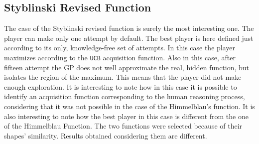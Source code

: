 \subsection{Styblinski Revised Function}
The case of the Styblinski revised function is surely the most interesting one. The player can make only one attempt by default. The best player is here defined just according to its only, knowledge-free set of attempts. In this case the player maximizes according to the {\tt UCB} acquisition function. Also in this case, after fifteen attempt the GP does not well approximate the real, hidden function, but isolates the region of the maximum. This means that the player did not make enough exploration. It is interesting to note how in this case it is possible to identify an acquisition function corresponding to the human reasoning process, considering that it was not possible in the case of the Himmelblau's function. It is also interesting to note how the best player in this case is different from the one of the Himmelblau Function. The two functions were selected because of their shapes' similarity. Results obtained considering them are different. \\




